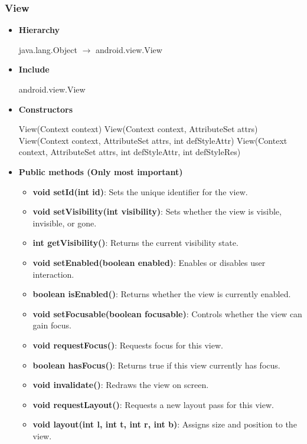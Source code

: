 \documentclass{report}
\begin{document}
    \subsubsection{View}
    \begin{itemize}
        \item \textbf{Hierarchy} 
            \begin{center}
                java.lang.Object $\to$	android.view.View
            \end{center}
        \item \textbf{Include}
            \bigbreak \noindent 
            \begin{javacode}
                android.view.View
            \end{javacode}
        \item \textbf{Constructors}
            \bigbreak \noindent 
            \begin{javacode}
                View(Context context)
                View(Context context, AttributeSet attrs)
                View(Context context, AttributeSet attrs, int defStyleAttr)
                View(Context context, AttributeSet attrs, int defStyleAttr, int defStyleRes)
            \end{javacode}

        \item \textbf{Public methods (Only most important)}
            \begin{itemize}
                \item \textbf{void setId(int id)}: Sets the unique identifier for the view.
                \item \textbf{void setVisibility(int visibility)}: Sets whether the view is visible, invisible, or gone.
                \item \textbf{int getVisibility()}: Returns the current visibility state.
                \item \textbf{void setEnabled(boolean enabled)}: Enables or disables user interaction.
                \item \textbf{boolean isEnabled()}: Returns whether the view is currently enabled.
                \item \textbf{void setFocusable(boolean focusable)}: Controls whether the view can gain focus.
                \item \textbf{void requestFocus()}: Requests focus for this view.
                \item \textbf{boolean hasFocus()}: Returns true if this view currently has focus.
                \item \textbf{void invalidate()}: Redraws the view on screen.
                \item \textbf{void requestLayout()}: Requests a new layout pass for this view.
                \item \textbf{void layout(int l, int t, int r, int b)}: Assigns size and position to the view.


\end{itemize}
\end{itemize}
\end{document}
